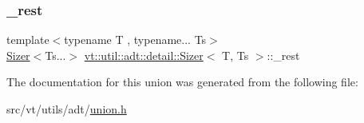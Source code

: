 \subsubsection{\texorpdfstring{\+\_\+rest}{\_rest}}
{\footnotesize\ttfamily template$<$typename T , typename... Ts$>$ \\
\hyperlink{unionvt_1_1util_1_1adt_1_1detail_1_1_sizer}{Sizer}$<$Ts...$>$ \hyperlink{unionvt_1_1util_1_1adt_1_1detail_1_1_sizer}{vt\+::util\+::adt\+::detail\+::\+Sizer}$<$ T, Ts $>$\+::\+\_\+rest}



The documentation for this union was generated from the following file\+:\begin{DoxyCompactItemize}
\item 
src/vt/utils/adt/\hyperlink{union_8h}{union.\+h}\end{DoxyCompactItemize}
